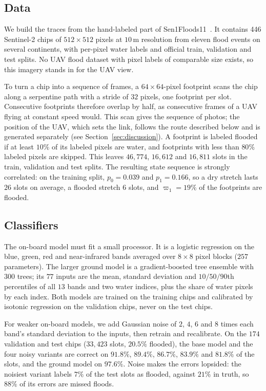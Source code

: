 \documentclass[5p,twocolumn]{elsarticle}
\theoremstyle{remark}
\begin{document}
\subsection{Data}
We build the traces from the hand-labeled part of Sen1Floods11~\cite{bonafilia2020sen1floods11}. It contains 446 Sentinel-2 chips of $512\times512$ pixels at $10$\,m resolution from eleven flood events on several continents, with per-pixel water labels and official train, validation and test splits. No UAV flood dataset with pixel labels of comparable size exists, so this imagery stands in for the UAV view.

To turn a chip into a sequence of frames, a $64\times64$-pixel footprint scans the chip along a serpentine path with a stride of $32$ pixels, one footprint per slot. Consecutive footprints therefore overlap by half, as consecutive frames of a UAV flying at constant speed would. This scan gives the sequence of photos; the position of the UAV, which sets the link, follows the route described below and is generated separately (see Section~\ref{sec:discussion}). A footprint is labeled flooded if at least $10\%$ of its labeled pixels are water, and footprints with less than $80\%$ labeled pixels are skipped. This leaves $46{,}774$, $16{,}612$ and $16{,}811$ slots in the train, validation and test splits. The resulting state sequence is strongly correlated: on the training split, $p_0=0.039$ and $p_1=0.166$, so a dry stretch lasts $26$ slots on average, a flooded stretch $6$ slots, and $\varpi_1=19\%$ of the footprints are flooded.

\subsection{Classifiers}\label{res:cls}
The on-board model must fit a small processor. It is a logistic regression on the blue, green, red and near-infrared bands averaged over $8\times8$ pixel blocks ($257$ parameters). The larger ground model is a gradient-boosted tree ensemble with $300$ trees; its $77$ inputs are the mean, standard deviation and $10/50/90$th percentiles of all $13$ bands and two water indices, plus the share of water pixels by each index. Both models are trained on the training chips and calibrated by isotonic regression on the validation chips, never on the test chips.

For weaker on-board models, we add Gaussian noise of $2$, $4$, $6$ and $8$ times each band's standard deviation to the inputs, then retrain and recalibrate. On the $174$ validation and test chips ($33{,}423$ slots, $20.5\%$ flooded), the base model and the four noisy variants are correct on $91.8\%$, $89.4\%$, $86.7\%$, $83.9\%$ and $81.8\%$ of the slots, and the ground model on $97.6\%$. Noise makes the errors lopsided: the noisiest variant labels $7\%$ of the test slots as flooded, against $21\%$ in truth, so $88\%$ of its errors are missed floods.
\end{document}
